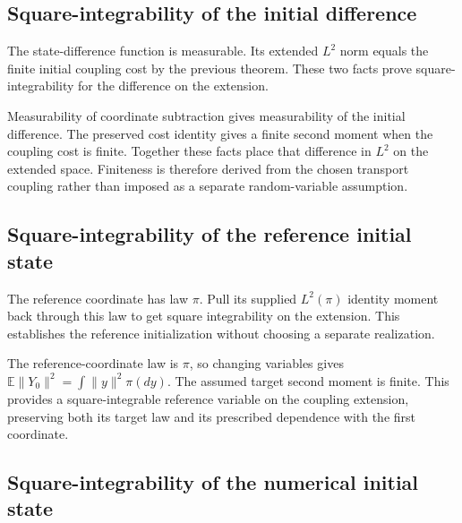 \documentclass[11pt,a4paper]{report}
\begin{document}
\subsection{\texorpdfstring{Square-integrability of the initial difference}{Square-integrability of the initial difference}}
\label{report-step-UnadjustedLangevin-InitialExtension-lean-16}


The state-difference function is measurable. Its extended \(L^2\) norm equals the finite initial coupling cost by the previous theorem. These two facts prove square-integrability for the difference on the extension.



Measurability of coordinate subtraction gives measurability of the initial difference. The preserved cost identity gives a finite second moment when the coupling cost is finite. Together these facts place that difference in \(L^2\) on the extended space. Finiteness is therefore derived from the chosen transport coupling rather than imposed as a separate random-variable assumption.

\subsection{\texorpdfstring{Square-integrability of the reference initial state}{Square-integrability of the reference initial state}}
\label{report-step-UnadjustedLangevin-InitialExtension-lean-17}


The reference coordinate has law \(\pi\). Pull its supplied \(L^2(\pi)\) identity moment back through this law to get square integrability on the extension. This establishes the reference initialization without choosing a separate realization.



The reference-coordinate law is \(\pi\), so changing variables gives \(\mathbb E\|Y_0\|^2=\int\|y\|^2\pi(dy)\). The assumed target second moment is finite. This provides a square-integrable reference variable on the coupling extension, preserving both its target law and its prescribed dependence with the first coordinate.

\subsection{\texorpdfstring{Square-integrability of the numerical initial state}{Square-integrability of the numerical initial state}}
\label{report-step-UnadjustedLangevin-InitialExtension-lean-18}
\end{document}
